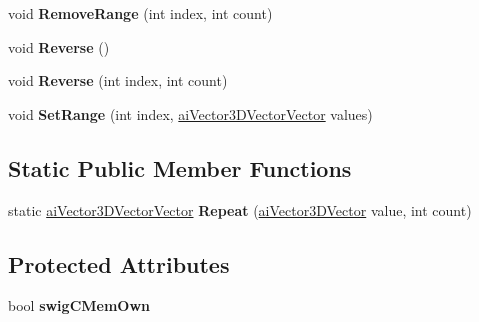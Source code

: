 \begin{DoxyCompactItemize}
\item 
\hypertarget{classai_vector3_d_vector_vector_adde03bc8a3327fd21ad67cf99a18e792}{void {\bfseries Remove\+Range} (int index, int count)}\label{classai_vector3_d_vector_vector_adde03bc8a3327fd21ad67cf99a18e792}

\item 
\hypertarget{classai_vector3_d_vector_vector_a57a172ce2c21e5e99601820dedfb7fa3}{void {\bfseries Reverse} ()}\label{classai_vector3_d_vector_vector_a57a172ce2c21e5e99601820dedfb7fa3}

\item 
\hypertarget{classai_vector3_d_vector_vector_abb2ba87d08613b36714efb5b6fbe5fd1}{void {\bfseries Reverse} (int index, int count)}\label{classai_vector3_d_vector_vector_abb2ba87d08613b36714efb5b6fbe5fd1}

\item 
\hypertarget{classai_vector3_d_vector_vector_adc02851299d65a0fb7d43bca56199a77}{void {\bfseries Set\+Range} (int index, \hyperlink{classai_vector3_d_vector_vector}{ai\+Vector3\+D\+Vector\+Vector} values)}\label{classai_vector3_d_vector_vector_adc02851299d65a0fb7d43bca56199a77}

\end{DoxyCompactItemize}
\subsection*{Static Public Member Functions}
\begin{DoxyCompactItemize}
\item 
\hypertarget{classai_vector3_d_vector_vector_a3e62cc09722584b4170704520007bd8b}{static \hyperlink{classai_vector3_d_vector_vector}{ai\+Vector3\+D\+Vector\+Vector} {\bfseries Repeat} (\hyperlink{classai_vector3_d_vector}{ai\+Vector3\+D\+Vector} value, int count)}\label{classai_vector3_d_vector_vector_a3e62cc09722584b4170704520007bd8b}

\end{DoxyCompactItemize}
\subsection*{Protected Attributes}
\begin{DoxyCompactItemize}
\item 
\hypertarget{classai_vector3_d_vector_vector_a1dfd51b7168d1d760b9b03fe4c4fdeed}{bool {\bfseries swig\+C\+Mem\+Own}}\label{classai_vector3_d_vector_vector_a1dfd51b7168d1d760b9b03fe4c4fdeed}

\end{DoxyCompactItemize}

